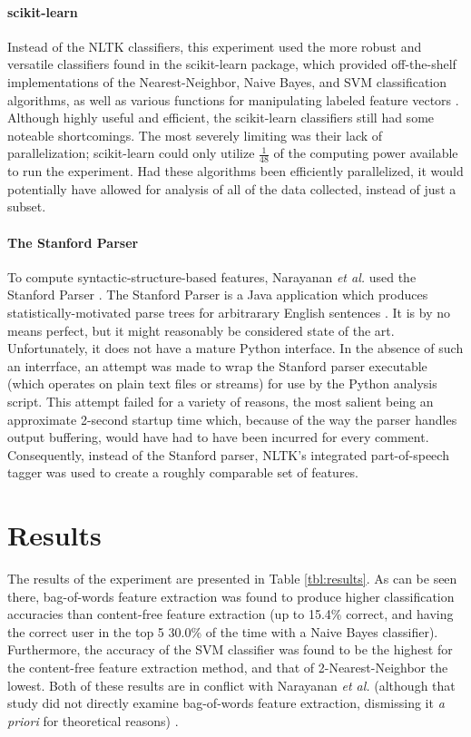 \documentclass{article}
\begin{document}
\paragraph{scikit-learn}
Instead of the NLTK classifiers, this experiment used the more robust and versatile classifiers found in the scikit-learn package, which provided off-the-shelf implementations of the Nearest-Neighbor, Naive Bayes, and SVM classification algorithms, as well as various functions for manipulating labeled feature vectors \cite{pedregosa2011scikit}. Although highly useful and efficient, the scikit-learn classifiers still had some noteable shortcomings. The most severely limiting was their lack of parallelization; scikit-learn could only utilize $\frac{1}{48}$ of the computing power available to run the experiment. Had these algorithms been efficiently parallelized, it would potentially have allowed for analysis of all of the data collected, instead of just a subset.

\paragraph{The Stanford Parser}
To compute syntactic-structure-based features, Narayanan \textit{et al.} used the Stanford Parser \cite{narayanan2012feasibility, klein2003accurate}. The Stanford Parser is a Java application which produces statistically-motivated parse trees for arbitrarary English sentences \cite{klein2003accurate}. It is by no means perfect, but it might reasonably be considered state of the art. Unfortunately, it does not have a mature Python interface. In the absence of such an interrface, an attempt was made to wrap the Stanford parser executable (which operates on plain text files or streams) for use by the Python analysis script. This attempt failed for a variety of reasons, the most salient being an approximate 2-second startup time which, because of the way the parser handles output buffering, would have had to have been incurred for every comment. Consequently, instead of the Stanford parser, NLTK's integrated part-of-speech tagger was used to create a roughly comparable set of features.

\section{Results}

The results of the experiment are presented in Table \ref{tbl:results}. As can be seen there, bag-of-words feature extraction was found to produce higher classification accuracies than content-free feature extraction (up to 15.4\% correct, and having the correct user in the top 5 30.0\% of the time with a Naive Bayes classifier). Furthermore, the accuracy of the SVM classifier was found to be the highest for the content-free feature extraction method, and that of 2-Nearest-Neighbor the lowest. Both of these results are in conflict with Narayanan \textit{et al.} (although that study did not directly examine bag-of-words feature extraction, dismissing it \textit{a priori} for theoretical reasons) \cite{narayanan2012feasibility}.
\end{document}

